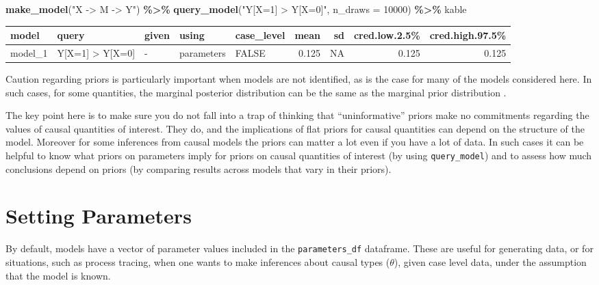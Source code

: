 \documentclass[
  12pt,
]{book}
\newenvironment{Shaded}{\begin{snugshade}}{\end{snugshade}}
\newcommand{\AttributeTok}[1]{\textcolor[rgb]{0.13,0.29,0.53}{#1}}
\newcommand{\DecValTok}[1]{\textcolor[rgb]{0.00,0.00,0.81}{#1}}
\newcommand{\FunctionTok}[1]{\textcolor[rgb]{0.13,0.29,0.53}{\textbf{#1}}}
\newcommand{\NormalTok}[1]{#1}
\newcommand{\SpecialCharTok}[1]{\textcolor[rgb]{0.81,0.36,0.00}{\textbf{#1}}}
\newcommand{\StringTok}[1]{\textcolor[rgb]{0.31,0.60,0.02}{#1}}
\begin{document}
\begin{Shaded}
\begin{Highlighting}[]
\FunctionTok{make\_model}\NormalTok{(}\StringTok{"X {-}\textgreater{} M {-}\textgreater{} Y"}\NormalTok{) }\SpecialCharTok{\%\textgreater{}\%}
  \FunctionTok{query\_model}\NormalTok{(}\StringTok{"Y[X=1] \textgreater{} Y[X=0]"}\NormalTok{, }\AttributeTok{n\_draws =} \DecValTok{10000}\NormalTok{) }\SpecialCharTok{\%\textgreater{}\%}
\NormalTok{  kable}
\end{Highlighting}
\end{Shaded}

\begin{tabular}{l|l|l|l|l|r|r|r|r}
\hline
model & query & given & using & case\_level & mean & sd & cred.low.2.5\% & cred.high.97.5\%\\
\hline
model\_1 & Y[X=1] > Y[X=0] & - & parameters & FALSE & 0.125 & NA & 0.125 & 0.125\\
\hline
\end{tabular}

Caution regarding priors is particularly important when models are not identified, as is the case for many of the models considered here. In such cases, for some quantities, the marginal posterior distribution can be the same as the marginal prior distribution \citep{poirier1998revising}.

The key point here is to make sure you do not fall into a trap of thinking that ``uninformative'' priors make no commitments regarding the values of causal quantities of interest. They do, and the implications of flat priors for causal quantities can depend on the structure of the model. Moreover for some inferences from causal models the priors can matter a lot even if you have a lot of data. In such cases it can be helpful to know what priors on parameters imply for priors on causal quantities of interest (by using \texttt{query\_model}) and to assess how much conclusions depend on priors (by comparing results across models that vary in their priors).

\hypertarget{parameters}{%
\section{Setting Parameters}\label{parameters}}

By default, models have a vector of parameter values included in the \texttt{parameters\_df} dataframe. These are useful for generating data, or for situations, such as process tracing, when one wants to make inferences about causal types (\(\theta\)), given case level data, under the assumption that the model is known.
\end{document}
